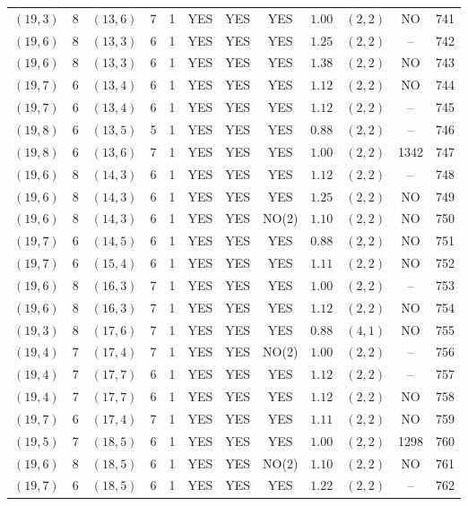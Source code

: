 \begin{longtable}{|c|c|c|c|c|c|c|c|c|c|c|c|}
$(19,3)$ & 8 & $(13,6)$ & 7 & 1 & YES & YES & YES & $1.00$ & $(2,2)$ & NO & 741\\
$(19,6)$ & 8 & $(13,3)$ & 6 & 1 & YES & YES & YES & $1.25$ & $(2,2)$ & -- & 742\\
$(19,6)$ & 8 & $(13,3)$ & 6 & 1 & YES & YES & YES & $1.38$ & $(2,2)$ & NO & 743\\
$(19,7)$ & 6 & $(13,4)$ & 6 & 1 & YES & YES & YES & $1.12$ & $(2,2)$ & NO & 744\\
$(19,7)$ & 6 & $(13,4)$ & 6 & 1 & YES & YES & YES & $1.12$ & $(2,2)$ & -- & 745\\
$(19,8)$ & 6 & $(13,5)$ & 5 & 1 & YES & YES & YES & $0.88$ & $(2,2)$ & -- & 746\\
$(19,8)$ & 6 & $(13,6)$ & 7 & 1 & YES & YES & YES & $1.00$ & $(2,2)$ & 1342 & 747\\
$(19,6)$ & 8 & $(14,3)$ & 6 & 1 & YES & YES & YES & $1.12$ & $(2,2)$ & -- & 748\\
$(19,6)$ & 8 & $(14,3)$ & 6 & 1 & YES & YES & YES & $1.25$ & $(2,2)$ & NO & 749\\
$(19,6)$ & 8 & $(14,3)$ & 6 & 1 & YES & YES & NO(2) & $1.10$ & $(2,2)$ & NO & 750\\
$(19,7)$ & 6 & $(14,5)$ & 6 & 1 & YES & YES & YES & $0.88$ & $(2,2)$ & NO & 751\\
$(19,7)$ & 6 & $(15,4)$ & 6 & 1 & YES & YES & YES & $1.11$ & $(2,2)$ & NO & 752\\
$(19,6)$ & 8 & $(16,3)$ & 7 & 1 & YES & YES & YES & $1.00$ & $(2,2)$ & -- & 753\\
$(19,6)$ & 8 & $(16,3)$ & 7 & 1 & YES & YES & YES & $1.12$ & $(2,2)$ & NO & 754\\
$(19,3)$ & 8 & $(17,6)$ & 7 & 1 & YES & YES & YES & $0.88$ & $(4,1)$ & NO & 755\\
$(19,4)$ & 7 & $(17,4)$ & 7 & 1 & YES & YES & NO(2) & $1.00$ & $(2,2)$ & -- & 756\\
$(19,4)$ & 7 & $(17,7)$ & 6 & 1 & YES & YES & YES & $1.12$ & $(2,2)$ & -- & 757\\
$(19,4)$ & 7 & $(17,7)$ & 6 & 1 & YES & YES & YES & $1.12$ & $(2,2)$ & NO & 758\\
$(19,7)$ & 6 & $(17,4)$ & 7 & 1 & YES & YES & YES & $1.11$ & $(2,2)$ & NO & 759\\
$(19,5)$ & 7 & $(18,5)$ & 6 & 1 & YES & YES & YES & $1.00$ & $(2,2)$ & 1298 & 760\\
$(19,6)$ & 8 & $(18,5)$ & 6 & 1 & YES & YES & NO(2) & $1.10$ & $(2,2)$ & NO & 761\\
$(19,7)$ & 6 & $(18,5)$ & 6 & 1 & YES & YES & YES & $1.22$ & $(2,2)$ & -- & 762\\

\end{longtable}
